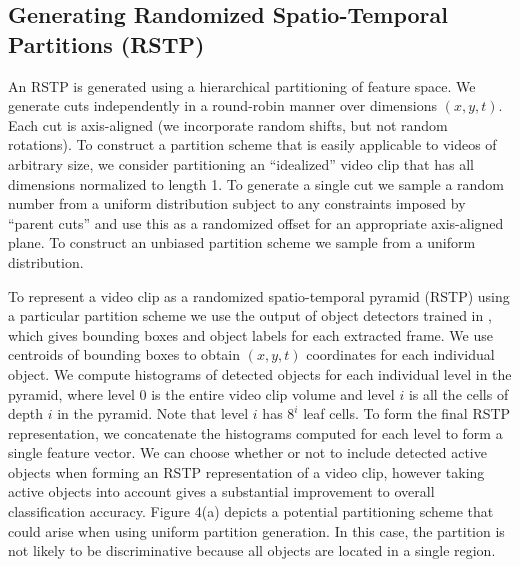\documentclass{bmvc2k}
\begin{document}
  \subsection{Generating Randomized Spatio-Temporal Partitions (RSTP)}
  An RSTP is generated using a hierarchical partitioning of feature space.  
  We generate cuts independently in a round-robin manner over dimensions $(x, y, t)$. 
  Each cut is axis-aligned
  (we incorporate random shifts, but not random rotations).
  To construct a partition scheme that is easily applicable to videos of
  arbitrary size, we consider
  partitioning an ``idealized'' video clip that has all dimensions normalized
  to length 1. To generate a single cut we sample a random number from a
  uniform distribution subject to any constraints imposed by ``parent cuts'' and use
  this as a randomized offset for an appropriate axis-aligned plane. To
  construct an unbiased partition scheme we sample from a uniform
  distribution.
  
  To represent a video clip as a randomized spatio-temporal pyramid (RSTP)
  using a particular partition scheme we use the output of object detectors
  trained in \cite{Ramanan12}, which gives bounding boxes and object
  labels for each extracted frame. We use centroids of bounding boxes to
  obtain $(x,y,t)$ coordinates for each individual object.
  We compute histograms of detected
  objects for each individual level in the pyramid,
  where level 0 is the entire video clip volume and level $i$ is all the
  cells of depth $i$ in the pyramid. 
  Note that level $i$ has $8^i$ leaf
  cells. To form the final RSTP representation, we concatenate the
  histograms computed for each level to form a single feature vector.
  We can choose whether or not to include detected active objects when
  forming an RSTP representation of a video clip, however taking active
  objects into account gives a substantial improvement to overall
  classification accuracy. Figure 4(a) depicts a potential partitioning
  scheme that could arise when using uniform partition generation. In this
  case, the partition is not likely to be discriminative because all objects
  are located in a single region.
  
\end{document}
